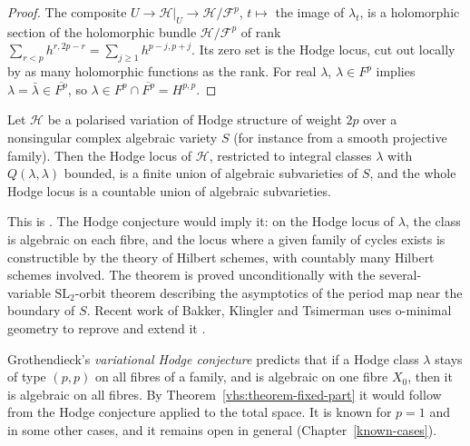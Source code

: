 \begin{proof}
The composite $U \to \mathcal{H}|_U \to \mathcal{H}/\mathcal{F}^p$, $t \mapsto$ the image of $\lambda_t$, is a holomorphic section of the holomorphic bundle $\mathcal{H}/\mathcal{F}^p$ of rank
$\sum_{r < p}h^{r,2p-r} = \sum_{j \geq 1}h^{p-j,p+j}$. Its zero set is the Hodge locus, cut out locally by as many holomorphic functions as the rank. For real $\lambda$, $\lambda \in F^p$ implies
$\lambda = \bar\lambda \in \overline{F^p}$, so $\lambda \in F^p \cap \overline{F^p} = H^{p,p}$.
\end{proof}

\begin{theorem}\label{vhs:theorem-cdk}
Let $\mathcal{H}$ be a polarised variation of Hodge structure of weight $2p$ over a nonsingular complex algebraic variety $S$ (for instance from a smooth projective family). Then the Hodge locus of $\mathcal{H}$,
restricted to integral classes $\lambda$ with $Q(\lambda, \lambda)$ bounded, is a finite union of algebraic subvarieties of $S$, and the whole Hodge locus is a countable union of algebraic subvarieties.
\end{theorem}

This is \cite{cattani-deligne-kaplan}. The Hodge conjecture would imply it: on the Hodge locus of $\lambda$, the class is algebraic on each fibre, and the locus where a given family of cycles exists is
constructible by the theory of Hilbert schemes, with countably many Hilbert schemes involved. The theorem is proved unconditionally with the several-variable $\mathrm{SL}_2$-orbit theorem describing
the asymptotics of the period map near the boundary of $S$. Recent work of Bakker, Klingler and Tsimerman uses o-minimal geometry to reprove and extend it \cite{bakker-klingler-tsimerman}.

\begin{remark}\label{vhs:remark-variational}
Grothendieck's \emph{variational Hodge conjecture} predicts that if a Hodge class $\lambda$ stays of type $(p,p)$ on all fibres of a family, and is algebraic on one fibre $X_0$, then it is algebraic on all fibres.
By Theorem~\ref{vhs:theorem-fixed-part} it would follow from the Hodge conjecture applied to the total space. It is known for $p = 1$ and in some other cases, and it remains open in general
(Chapter~\ref{known-cases}).
\end{remark}

